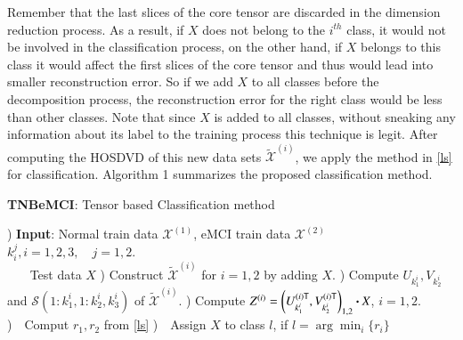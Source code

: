 \documentclass[preprint,12pt]{elsarticle}
\begin{document}
	Remember that the last slices of the core tensor are discarded in the dimension reduction process. As a result, if $X$ does not belong to the $i^{th}$ class, it would not be involved in the classification process, on the other hand, if $X$ belongs to this class it would affect the first slices of the core tensor and thus would lead into smaller reconstruction error. So if we add $X$ to all classes before the decomposition process, the reconstruction error for the right class would be less than other classes. Note that since $X$ is added to all classes, without sneaking any information about its label to the training process this technique is legit.      
	After computing the HOSDVD of this new data sets $\widetilde{\mathcal{X}}^{(i)}$, we apply the method in \eqref{ls} for classification.  Algorithm 1 summarizes the proposed classification method.
	\begin{algorithm}[h!]
		\label{ATNB}
		\caption{\textbf{TNBeMCI}: Tensor based Classification method}
		\begin{algorithmic}
			) \textbf{Input}: Normal train data $\mathcal{X}^{(1)}$, eMCI train data $\mathcal{X}^{(2)}$
			\STATE~~~    $k_i^j, i=1,2,3, \quad j=1,2$.\\
			\STATE~~~ Test data $X$
			) Construct $\widetilde{\mathcal{X}}^{(i)}$ for $i=1,2$ by adding $X$.
			) Compute $U_{k_1^i}, V_{k_2^i}$ and $\mathcal{S}(1:k_1^i,1:k_2^i,k_3^i)$ of  $\widetilde{\mathcal{X}}^{(i)}$.
			) Compute $Z^{(i)} = \left( U_{k_1^i}^{(i)\sf T}, V_{k_2^i}^{(i)\sf T} 
			\right)_{1,2}\boldsymbol{\cdot} X$, $i=1,2.$
			)~~Comput $r_1,r_2$ from \eqref{ls}
			 )~~Assign $X$ to class $l$, if $l= \arg \min_{i} \{r_i\}$
		\end{algorithmic}
	\end{algorithm}
	
\end{document}
